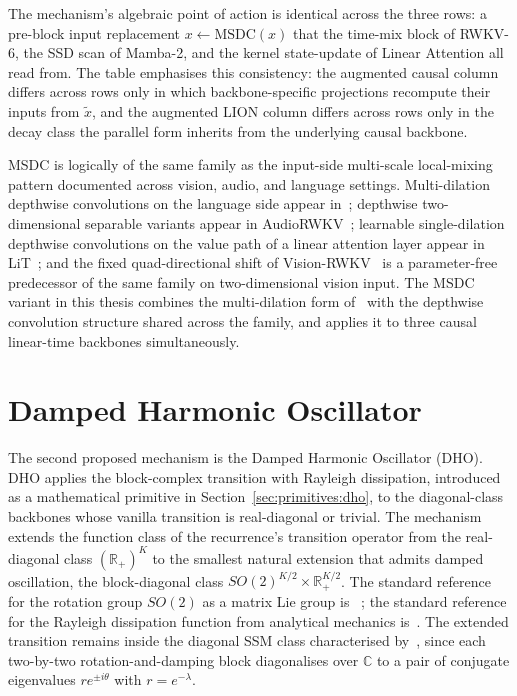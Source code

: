 The mechanism's algebraic point of action is identical across the
three rows: a pre-block input replacement
$x \leftarrow \mathrm{MSDC}(x)$ that the time-mix block of RWKV-6,
the SSD scan of Mamba-2, and the kernel state-update of Linear
Attention all read from. The table emphasises this consistency: the
augmented causal column differs across rows only in which
backbone-specific projections recompute their inputs from
$\tilde{x}$, and the augmented LION column differs across rows only
in the decay class the parallel form inherits from the underlying
causal backbone.

MSDC is logically of the same family as the input-side multi-scale
local-mixing pattern documented across vision, audio, and language
settings. Multi-dilation depthwise convolutions on the language side
appear in~\citet{kiruluta2025breaking}; depthwise two-dimensional
separable variants appear in
AudioRWKV~\cite{xiong2025audiorwkv}; learnable single-dilation
depthwise convolutions on the value path of a linear attention layer
appear in LiT~\cite{wang2025lit}; and the fixed quad-directional
shift of Vision-RWKV~\cite{duan2024visionrwkv} is a parameter-free
predecessor of the same family on two-dimensional vision input. The
MSDC variant in this thesis combines the multi-dilation form
of~\citet{kiruluta2025breaking} with the depthwise convolution
structure shared across the family, and applies it to three causal
linear-time backbones simultaneously.

\section{Damped Harmonic Oscillator}\label{sec:proposed:dho}

The second proposed mechanism is the Damped Harmonic Oscillator
(DHO). DHO applies the block-complex transition with Rayleigh
dissipation, introduced as a mathematical primitive in
Section~\ref{sec:primitives:dho}, to the diagonal-class backbones
whose vanilla transition is real-diagonal or trivial. The mechanism extends the function class of the
recurrence's transition operator from the real-diagonal class
$(\mathbb{R}_{+})^{K}$ to the smallest natural extension that admits
damped oscillation, the block-diagonal class
$SO(2)^{K/2} \times \mathbb{R}_{+}^{K/2}$. The standard reference for
the rotation group $SO(2)$ as a matrix Lie group is
~\citet[Chapter~1]{hall2015lie}; the standard reference for the
Rayleigh dissipation function from analytical mechanics
is~\citet[Sections~1.5 and~2.5]{goldstein2002classical}. The extended
transition remains inside the diagonal SSM class characterised
by~\citet{sarrof2024expressive}, since each two-by-two
rotation-and-damping block diagonalises over $\mathbb{C}$ to a pair
of conjugate eigenvalues $r e^{\pm i \theta}$ with $r = e^{-\lambda}$.

